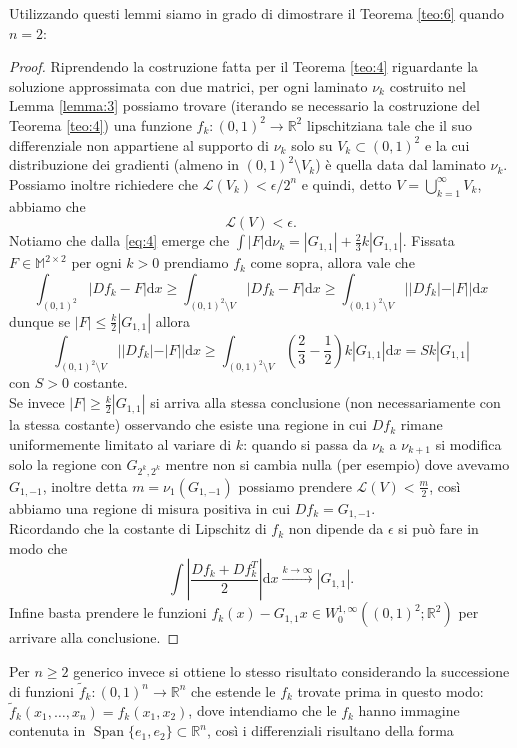 \documentclass[a4paper,11pt]{book}
\theoremstyle{plain}
\theoremstyle{definition}
\theoremstyle{remark}
\newcommand{\R}{\mathbb{R}}
\newcommand{\M}{\mathbb{M}}
\newcommand{\LL}{\mathscr{L}}
\newcommand{\dx}{\text{d}x}
\newcommand{\diff}{\text{d}}
\DeclareMathOperator{\Span}{Span}
\begin{document}
Utilizzando questi lemmi siamo in grado di dimostrare il Teorema \ref{teo:6} quando $n=2$:
\begin{proof}
	Riprendendo la costruzione fatta per il Teorema \ref{teo:4} riguardante la soluzione approssimata con due matrici, per ogni laminato $\nu_k$ costruito nel Lemma \ref{lemma:3} possiamo trovare (iterando se necessario la costruzione del Teorema \ref{teo:4}) una funzione $f_k:(0,1)^2\to\R^2$ lipschitziana tale che il suo differenziale non appartiene al supporto di $\nu_k$ solo su $V_k\subset (0,1)^2$ e la cui distribuzione dei gradienti (almeno in $(0,1)^2\setminus V_k$) è quella data dal laminato $\nu_k$. Possiamo inoltre richiedere che $\LL(V_k)<\epsilon/2^n$ e quindi, detto $V=\bigcup_{k=1}^{\infty} V_k$, abbiamo che
	\[\LL(V)<\epsilon.\]
	Notiamo che dalla \eqref{eq:4} emerge che $\int|F|\diff\nu_k = |G_{1,1}|+\frac{2}{3}k|G_{1,1}|$. Fissata $F\in\M^{2\times 2}$ per ogni $k>0$ prendiamo $f_k$ come sopra, allora vale che
	\[
		\int_{(0,1)^2}|Df_k-F|\dx \geq \int_{(0,1)^2\setminus V}|Df_k-F|\dx \geq \int_{(0,1)^2\setminus V}||Df_k|-|F||\dx
	\]
	dunque se $|F|\leq \frac{k}{2}|G_{1,1}|$ allora
	\[
		\int_{(0,1)^2\setminus V}||Df_k|-|F||\dx \geq \int_{(0,1)^2\setminus V}\left(\frac{2}{3}-\frac{1}{2}\right)k|G_{1,1}|\dx = Sk|G_{1,1}|
	\]
	con $S>0$ costante.\\
	Se invece $|F|\geq \frac{k}{2}|G_{1,1}|$ si arriva alla stessa conclusione (non necessariamente con la stessa costante) osservando che esiste una regione in cui $Df_k$ rimane uniformemente limitato al variare di $k$: quando si passa da $\nu_{k}$ a $\nu_{k+1}$ si modifica solo la regione con $G_{2^k,2^k}$ mentre non si cambia nulla (per esempio) dove avevamo $G_{1,-1}$, inoltre detta $m=\nu_1(G_{1,-1})$ possiamo prendere $\displaystyle\LL(V)<\frac{m}{2}$, così abbiamo una regione di misura positiva in cui $Df_k=G_{1,-1}$.\\
	Ricordando che la costante di Lipschitz di $f_k$ non dipende da $\epsilon$ si può fare in modo che
	\[
		\int \left|\frac{Df_k+Df_k^T}{2}\right|\dx\xrightarrow{k\to\infty}|G_{1,1}|.
	\]
	Infine basta prendere le funzioni $f_{k}(x)-G_{1,1}x\in W^{1,\infty}_{0}((0,1)^{2};\R^{2})$ per arrivare alla conclusione.
\end{proof}
Per $n\geq 2$ generico invece si ottiene lo stesso risultato considerando la successione di funzioni $\widetilde{f}_k:(0,1)^n\to \R^n$ che estende le $f_k$ trovate prima in questo modo: $\widetilde{f}_k(x_1,\ldots,x_n) = f_k(x_1,x_2)$, dove intendiamo che le $f_k$ hanno immagine contenuta in $\Span\{e_1,e_2\}\subset \R^n$, così i differenziali risultano della forma
\end{document}
